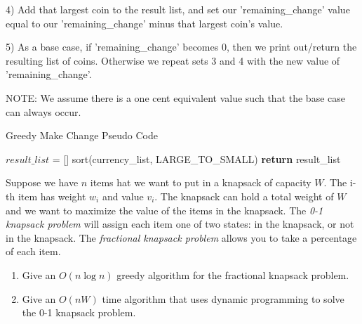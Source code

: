 \documentclass{article}
\begin{document}
4) Add that largest coin to the result list, and set our 'remaining\_change' value equal to our 'remaining\_change' minus that largest coin's value.

5) As a base case, if 'remaining\_change' becomes 0, then we print out/return the resulting list of coins. Otherwise we repeat sets 3 and 4 with the new value of 'remaining\_change'. 

NOTE: We assume there is a one cent equivalent value such that the base case can always occur.

\begin{algorithm}
        \caption{Greedy Make Change Pseudo Code}
        \begin{algorithmic}
            \State $result\_list$ = []
            \State sort(currency_list, LARGE_TO_SMALL) 
            \State \textbf{return} result\_list
        \EndProcedure
    \end{algorithmic}
\end{algorithm}


\nextprob
Suppose we have $n$ items hat we want to put in a knapsack of capacity $W$.  The i-th item has
weight $w_i$ and value $v_i$.  The knapsack can hold a total weight of $W$ and
we want to maximize the value of the items in the knapsack.
The \emph{0-1 knapsack problem} will assign each item one of two states: in the
knapsack, or not in the knapsack.  The \emph{fractional knapsack problem} allows
you to take a percentage of each item.
\begin{enumerate}
    \item Give an $O(n\log n)$ greedy algorithm for the fractional knapsack problem.
    \item Give an $O(nW)$ time algorithm that uses dynamic programming to solve
        the 0-1 knapsack problem.
\end{enumerate}
\end{document}
